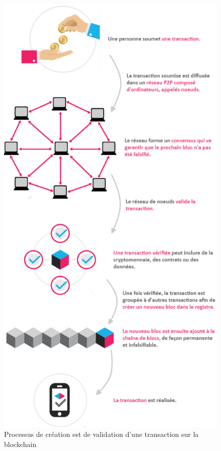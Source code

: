 \documentclass{tnreport}
\begin{document}
\begin{figure}[h]
	\centering
	\includegraphics[scale=0.45]{figures/blockchain-diagram}
	\caption{Processus de création est de validation d'une transaction sur la blockchain \cite{blockchain}}
	\label{fig:blockchain-diagram}
\end{figure}
\clearpage
\end{document}
